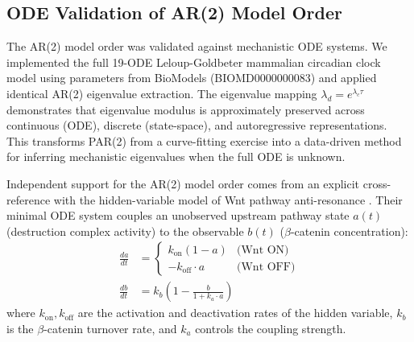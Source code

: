 \documentclass[11pt,letterpaper]{article}
\begin{document}
\subsection{ODE Validation of AR(2) Model Order}

The AR(2) model order was validated against mechanistic ODE systems. We implemented the full 19-ODE Leloup-Goldbeter mammalian circadian clock model \citep{leloup2003} using parameters from BioModels (BIOMD0000000083) and applied identical AR(2) eigenvalue extraction. The eigenvalue mapping $\lambda_d = e^{\lambda_c \tau}$ demonstrates that eigenvalue modulus is approximately preserved across continuous (ODE), discrete (state-space), and autoregressive representations. This transforms PAR(2) from a curve-fitting exercise into a data-driven method for inferring mechanistic eigenvalues when the full ODE is unknown.

Independent support for the AR(2) model order comes from an explicit cross-reference with the hidden-variable model of Wnt pathway anti-resonance \citep{rosen2026}. Their minimal ODE system couples an unobserved upstream pathway state $a(t)$ (destruction complex activity) to the observable $b(t)$ ($\beta$-catenin concentration):
\begin{align}
\frac{da}{dt} &= \begin{cases} k_{\text{on}}(1 - a) & \text{(Wnt ON)} \\ -k_{\text{off}} \cdot a & \text{(Wnt OFF)} \end{cases} \label{eq:rosen_a} \\
\frac{db}{dt} &= k_b\left(1 - \frac{b}{1 + k_a \cdot a}\right) \label{eq:rosen_b}
\end{align}
where $k_{\text{on}}, k_{\text{off}}$ are the activation and deactivation rates of the hidden variable, $k_b$ is the $\beta$-catenin turnover rate, and $k_a$ controls the coupling strength.
\end{document}
